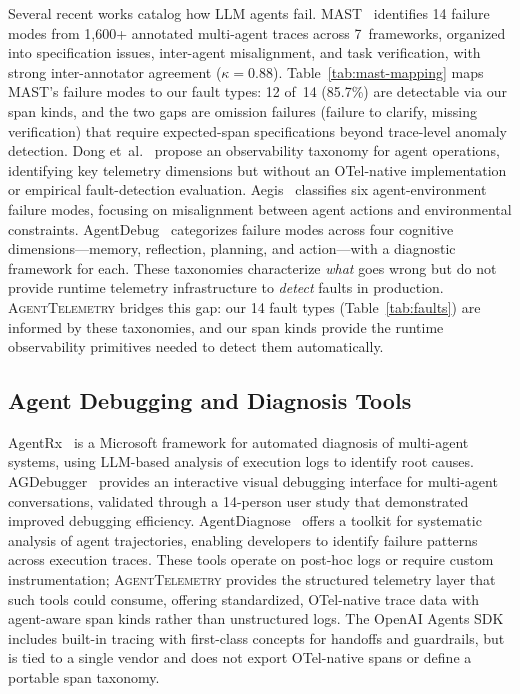 \documentclass[sigplan,10pt,screen]{acmart}
\begin{document}
Several recent works catalog how LLM agents fail.
MAST~\cite{mast} identifies 14 failure modes from 1{,}600+ annotated
multi-agent traces across 7~frameworks, organized into specification issues,
inter-agent misalignment, and task verification, with strong inter-annotator
agreement ($\kappa = 0.88$).
Table~\ref{tab:mast-mapping} maps MAST's failure modes to our fault types:
12 of~14 (85.7\%) are detectable via our span kinds, and the two gaps are
omission failures (failure to clarify, missing verification) that require
expected-span specifications beyond trace-level anomaly detection.
Dong et~al.~\cite{agentops} propose an observability taxonomy for agent
operations, identifying key telemetry dimensions but without an OTel-native
implementation or empirical fault-detection evaluation.
Aegis~\cite{aegis} classifies six agent-environment failure modes,
focusing on misalignment between agent actions and environmental
constraints.
AgentDebug~\cite{agentdebug} categorizes failure modes across four
cognitive dimensions---memory, reflection, planning, and action---with
a diagnostic framework for each.
These taxonomies characterize \emph{what} goes wrong but do not provide
runtime telemetry infrastructure to \emph{detect} faults in production.
\textsc{AgentTelemetry} bridges this gap: our 14 fault types
(Table~\ref{tab:faults}) are informed by these taxonomies, and our span
kinds provide the runtime observability primitives needed to detect them
automatically.

\subsection{Agent Debugging and Diagnosis Tools}

AgentRx~\cite{agentrx} is a Microsoft framework for automated
diagnosis of multi-agent systems, using LLM-based analysis of
execution logs to identify root causes.
AGDebugger~\cite{agdebugger} provides an interactive visual debugging
interface for multi-agent conversations, validated through a 14-person
user study that demonstrated improved debugging efficiency.
AgentDiagnose~\cite{agentdiagnose} offers a toolkit for systematic
analysis of agent trajectories, enabling developers to identify failure
patterns across execution traces.
These tools operate on post-hoc logs or require custom instrumentation;
\textsc{AgentTelemetry} provides the structured telemetry layer that
such tools could consume, offering standardized, OTel-native trace data
with agent-aware span kinds rather than unstructured logs.
The OpenAI Agents SDK~\cite{openai_agents_sdk} includes built-in
tracing with first-class concepts for handoffs and guardrails, but is
tied to a single vendor and does not export OTel-native spans or
define a portable span taxonomy.
\end{document}
